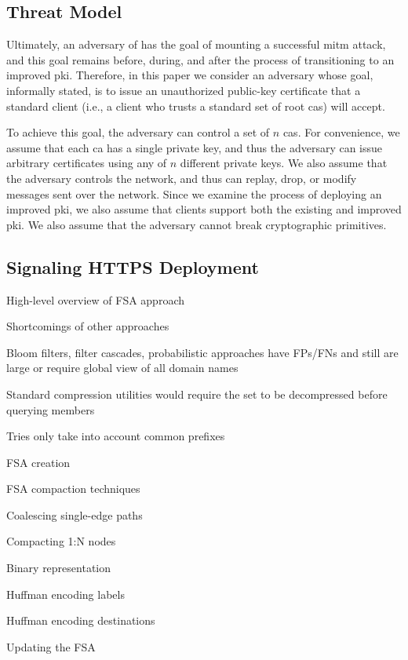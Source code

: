\subsection{Threat Model}
\label{sec:design:threat}

Ultimately, an adversary of  has the goal of mounting a successful
\ac{mitm} attack, and this goal remains before, during, and after the process of
transitioning to an improved \ac{pki}. Therefore, in this paper we consider an
adversary whose goal, informally stated, is to issue an unauthorized public-key
certificate that a standard client (i.e., a client who trusts a standard set of
root \acp{ca}) will accept.

To achieve this goal, the adversary can control a set of $n$ \acp{ca}. For
convenience, we assume that each \ac{ca} has a single private key, and thus the
adversary can issue arbitrary certificates using any of $n$ different private
keys. We also assume that the adversary controls the network, and thus can
replay, drop, or modify messages sent over the network. Since we examine the
process of deploying an improved \ac{pki}, we also assume that clients support
both the existing and improved \ac{pki}. We also assume that the adversary
cannot break cryptographic primitives.

\subsection{Signaling HTTPS Deployment}
\label{sec:design:signaling}

\begin{compactitem}
\item High-level overview of FSA approach 
\item Shortcomings of other approaches
  \begin{compactitem}
  \item Bloom filters, filter cascades, probabilistic approaches have FPs/FNs
    and still are large or require global view of all domain names
  \item Standard compression utilities would require the set to be decompressed
    before querying members
  \item Tries only take into account common prefixes
  \end{compactitem}
\item FSA creation
\item FSA compaction techniques
  \begin{compactitem}
  \item Coalescing single-edge paths
  \item Compacting 1:N nodes
  \item Binary representation
  \item Huffman encoding labels
  \item Huffman encoding destinations
  \end{compactitem}
\item Updating the FSA
\end{compactitem}


